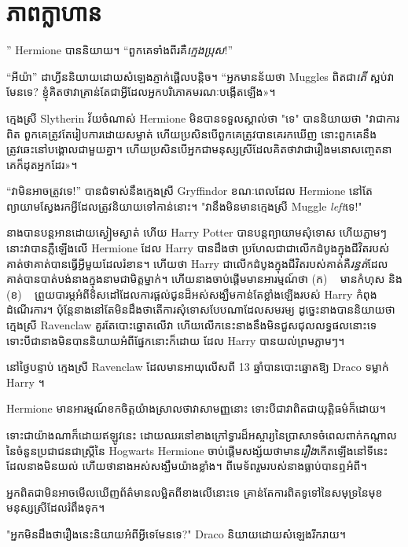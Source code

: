 \chapter{ភាពក្លាហាន}

” Hermione បាននិយាយ។ “ពួកគេទាំងពីរគឺ\emph{ក្មេងប្រុស}!”

\hplettrineextrapara
“អីយ៉ា” ដាហ្វីននិយាយដោយសំឡេងភ្ញាក់ផ្អើលបន្តិច។ “អ្នកមានន័យថា Muggles ពិតជា\emph{តើ} ស្អប់វាមែនទេ? ខ្ញុំ​គិត​ថា​វា​គ្រាន់​តែ​ជា​អ្វី​ដែល​អ្នក​បរិភោគ​មរណៈ​បង្កើត​ឡើង»។

ក្មេងស្រី Slytherin វ័យចំណាស់ Hermione មិនបានទទួលស្គាល់ថា "ទេ" បាននិយាយថា "វាជាការពិត ពួកគេត្រូវតែរៀបការដោយសម្ងាត់ ហើយប្រសិនបើពួកគេត្រូវបានគេរកឃើញ នោះពួកគេនឹងត្រូវឆេះនៅបង្គោលជាមួយគ្នា។ ហើយ​ប្រសិន​បើ​អ្នក​ជា​មនុស្ស​ស្រី​ដែល​គិត​ថា​វា​ជា​រឿង​មនោសញ្ចេតនា គេ​ក៏​ដុត​អ្នក​ដែរ»។

“វាមិនអាចត្រូវទេ!” បានជំទាស់នឹងក្មេងស្រី Gryffindor ខណៈពេលដែល Hermione នៅតែព្យាយាមស្វែងរកអ្វីដែលត្រូវនិយាយទៅកាន់នោះ។ "វានឹងមិនមានក្មេងស្រី Muggle \emph{left}ទេ!"

នាងបានបន្តអានដោយស្ងៀមស្ងាត់ ហើយ Harry Potter បានបន្តព្យាយាមសុំទោស ហើយភ្លាមៗនោះវាបានភ្លឺឡើងលើ Hermione ដែល Harry បានដឹងថា ប្រហែលជាជាលើកដំបូងក្នុងជីវិតរបស់គាត់ថាគាត់បានធ្វើអ្វីមួយដែលរំខាន។ ហើយថា Harry ជាលើកដំបូងក្នុងជីវិតរបស់គាត់គឺ\emph{រន្ធត់}ដែលគាត់បានបាត់បង់នាងក្នុងនាមជាមិត្តម្នាក់។ ហើយនាងចាប់ផ្តើមមានអារម្មណ៍ថា (ក) ~ មានកំហុស និង (ខ) ~ ព្រួយបារម្ភអំពីទិសដៅដែលការផ្តល់ជូនដ៏អស់សង្ឃឹមកាន់តែខ្លាំងឡើងរបស់ Harry កំពុងដំណើរការ។ ប៉ុន្តែនាងនៅតែមិនដឹងថាតើការសុំទោសបែបណាដែលសមរម្យ ដូច្នេះនាងបាននិយាយថា ក្មេងស្រី Ravenclaw គួរតែបោះឆ្នោតលើវា ហើយលើកនេះនាងនឹងមិនជួសជុលលទ្ធផលនោះទេ ទោះបីជានាងមិនបាននិយាយអំពីផ្នែកនោះក៏ដោយ ដែល Harry បានយល់ព្រមភ្លាមៗ។

នៅថ្ងៃបន្ទាប់ ក្មេងស្រី Ravenclaw ដែលមានអាយុលើសពី 13 ឆ្នាំបានបោះឆ្នោតឱ្យ Draco ទម្លាក់ Harry ។

Hermione មាន​អារម្មណ៍​ខក​ចិត្ត​យ៉ាង​ស្រាល​ថា​វា​សាមញ្ញ​នោះ ទោះ​បី​ជា​វា​ពិត​ជា​យុត្តិធម៌​ក៏​ដោយ។

ទោះជាយ៉ាងណាក៏ដោយឥឡូវនេះ ដោយឈរនៅខាងក្រៅទ្វារដ៏អស្ចារ្យនៃប្រាសាទចំពេលពាក់កណ្តាលនៃចំនួនប្រជាជនជាស្ត្រីនៃ Hogwarts Hermione ចាប់ផ្តើមសង្ស័យថាមាន\emph{រឿង}កើតឡើងនៅទីនេះដែលនាងមិនយល់ ហើយថានាងអស់សង្ឃឹមយ៉ាងខ្លាំង។ ពី​មេទ័ព​រួម​របស់​នាង​ធ្លាប់​បាន​ឮ​អំពី។

\later

អ្នកពិតជាមិនអាចមើលឃើញព័ត៌មានលម្អិតពីខាងលើនោះទេ គ្រាន់តែការពិតទូទៅនៃសមុទ្រនៃមុខមនុស្សស្រីដែលរំពឹងទុក។

"អ្នកមិនដឹងថារឿងនេះនិយាយអំពីអ្វីទេមែនទេ?" Draco និយាយដោយសំឡេងរីករាយ។

